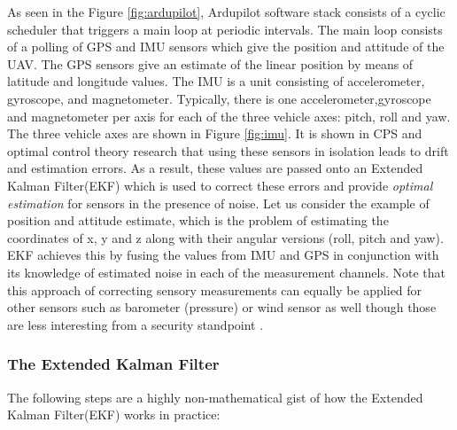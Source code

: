 As seen in the Figure \ref{fig:ardupilot}, Ardupilot software stack consists of a cyclic scheduler that triggers a main loop at periodic intervals. The main loop consists of a polling of GPS and IMU sensors which give the position and attitude of the UAV. The GPS sensors give an estimate of the linear position by means of latitude and longitude values. The IMU is a unit consisting of accelerometer, gyroscope, and magnetometer. Typically, there is one accelerometer,gyroscope and magnetometer per axis for each of the three vehicle axes: pitch, roll and yaw. The three vehicle axes are shown in Figure \ref{fig:imu}. It is shown in CPS and optimal control theory research \cite{dissanayake2001solution} that using these sensors in isolation leads to drift and estimation errors. As a result, these values are passed onto an Extended Kalman Filter(EKF) which is used to correct these errors and provide \textit{optimal estimation} for sensors in the presence of noise. Let us consider the example of position and attitude estimate, which is the problem of estimating the coordinates of x, y and z along with their angular versions (roll, pitch and yaw). EKF achieves this by fusing the values from IMU and GPS in conjunction with its knowledge of estimated noise in each of the measurement channels. Note that this approach of correcting sensory measurements can equally be applied for other sensors such as barometer (pressure) or wind sensor as well though those are less interesting from a security standpoint \cite{raginskyuiuc}.

\subsubsection{The Extended Kalman Filter} The following steps are a highly non-mathematical gist of how the Extended Kalman Filter(EKF) works in practice:

